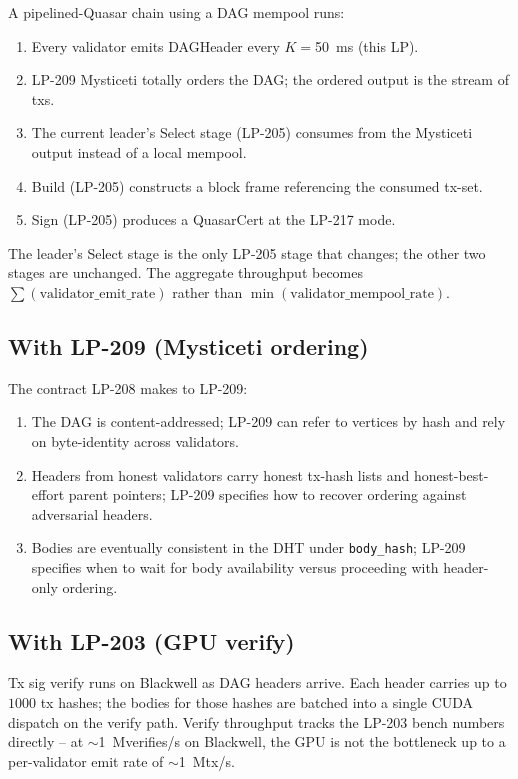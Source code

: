 A pipelined-Quasar chain using a DAG mempool runs:

\begin{enumerate}[leftmargin=2em,nosep]
\item Every validator emits DAGHeader every $K{=}$\SI{50}{\milli\second} (this LP).
\item LP-209 Mysticeti totally orders the DAG; the ordered output is the
  stream of txs.
\item The current leader's Select stage (LP-205) consumes from the
  Mysticeti output instead of a local mempool.
\item Build (LP-205) constructs a block frame referencing the consumed
  tx-set.
\item Sign (LP-205) produces a QuasarCert at the LP-217 mode.
\end{enumerate}

The leader's Select stage is the only LP-205 stage that changes; the
other two stages are unchanged. The aggregate throughput becomes
$\sum(\textrm{validator\_emit\_rate})$ rather than
$\min(\textrm{validator\_mempool\_rate})$.

\subsection{With LP-209 (Mysticeti ordering)}

The contract LP-208 makes to LP-209:

\begin{enumerate}[leftmargin=2em,nosep]
\item The DAG is content-addressed; LP-209 can refer to vertices by
  hash and rely on byte-identity across validators.
\item Headers from honest validators carry honest tx-hash lists and
  honest-best-effort parent pointers; LP-209 specifies how to recover
  ordering against adversarial headers.
\item Bodies are eventually consistent in the DHT under
  \texttt{body\_hash}; LP-209 specifies when to wait for body
  availability versus proceeding with header-only ordering.
\end{enumerate}

\subsection{With LP-203 (GPU verify)}

Tx sig verify runs on Blackwell as DAG headers arrive. Each header
carries up to $1000$ tx hashes; the bodies for those hashes are
batched into a single CUDA dispatch on the verify path. Verify
throughput tracks the LP-203 bench numbers directly -- at
$\sim$\SI{1}{\mega verifies/s} on Blackwell, the GPU is not the
bottleneck up to a per-validator emit rate of
$\sim$\SI{1}{\mega tx/s}.

